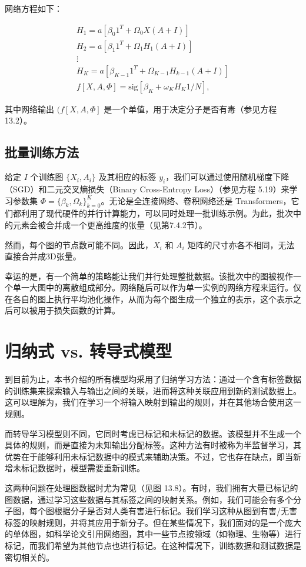 网络方程如下：


\begin{align}
H_1 = a[\beta_0 1^T + \Omega_0 X(A + I)] \\
H_2 = a[\beta_1 1^T + \Omega_1 H_1(A + I)] \\
\vdots \\
H_K = a[\beta_{K-1} 1^T + \Omega_{K-1} H_{k-1}(A + I)] \\
f[X, A, \Phi] = \text{sig}[\beta_K + \omega_K H_K 1/N], \tag{13.11}
\end{align} 


其中网络输出 \((f[X, A, \Phi]\) 是一个单值，用于决定分子是否有毒（参见方程 13.2）。
\subsection{批量训练方法}
给定 \(I\) 个训练图 \(\{X_i, A_i\}\) 及其相应的标签 \(y_i\)，我们可以通过使用随机梯度下降（SGD）和二元交叉熵损失（Binary Cross-Entropy Loss）（参见方程 5.19）来学习参数集 \(\Phi = \{\beta_k, \Omega_k\}^K_{k=0}\)。无论是全连接网络、卷积网络还是 Transformers，它们都利用了现代硬件的并行计算能力，可以同时处理一批训练示例。为此，批次中的元素会被合并成一个更高维度的张量（见第7.4.2节）。

然而，每个图的节点数可能不同。因此，\(X_i\) 和 \(A_i\) 矩阵的尺寸亦各不相同，无法直接合并成3D张量。

幸运的是，有一个简单的策略能让我们并行处理整批数据。该批次中的图被视作一个单一大图中的离散组成部分。网络随后可以作为单一实例的网络方程来运行。仅在各自的图上执行平均池化操作，从而为每个图生成一个独立的表示，这个表示之后可以被用于损失函数的计算。
\section{归纳式 vs. 转导式模型}
到目前为止，本书介绍的所有模型均采用了归纳学习方法：通过一个含有标签数据的训练集来探索输入与输出之间的关联，进而将这种关联应用到新的测试数据上。这可以理解为，我们在学习一个将输入映射到输出的规则，并在其他场合使用这一规则。

而转导学习模型则不同，它同时考虑已标记和未标记的数据。该模型并不生成一个具体的规则，而是直接为未知输出分配标签。这种方法有时被称为半监督学习，其优势在于能够利用未标记数据中的模式来辅助决策。不过，它也存在缺点，即当新增未标记数据时，模型需要重新训练。

这两种问题在处理图数据时尤为常见（见图 13.8）。有时，我们拥有大量已标记的图数据，通过学习这些数据与其标签之间的映射关系。例如，我们可能会有多个分子图，每个图根据分子是否对人类有害进行标记。我们学习这种从图到有害/无害标签的映射规则，并将其应用于新分子。但在某些情况下，我们面对的是一个庞大的单体图，如科学论文引用网络图，其中一些节点按领域（如物理、生物等）进行标记，而我们希望为其他节点也进行标记。在这种情况下，训练数据和测试数据是密切相关的。

